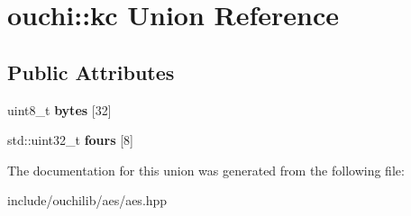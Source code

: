 \hypertarget{unionouchi_1_1kc}{}\section{ouchi\+::kc Union Reference}
\label{unionouchi_1_1kc}
\subsection*{Public Attributes}
\begin{DoxyCompactItemize}
\item 
\mbox{\label{unionouchi_1_1kc_a051492536ef20688416474d6fbf08902}} 
uint8\+\_\+t {\bfseries bytes} \mbox{[}32\mbox{]}
\item 
\mbox{\label{unionouchi_1_1kc_ab4178e397945ee0bf659d3242399353b}} 
std\+::uint32\+\_\+t {\bfseries fours} \mbox{[}8\mbox{]}
\end{DoxyCompactItemize}


The documentation for this union was generated from the following file\+:\begin{DoxyCompactItemize}
\item 
include/ouchilib/aes/aes.\+hpp\end{DoxyCompactItemize}
